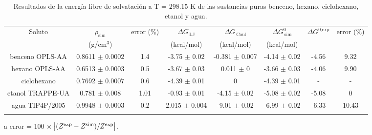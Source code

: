 \documentclass[3p,twocolumn]{elsarticle}
\begin{document}
\begin{table}[htp]
\centering
\begin{adjustbox}{width=1\textwidth}
\begin{threeparttable}
\caption{Resultados de la energía libre de solvatación a T = 298.15 K de las sustancias puras benceno, hexano, ciclohexano, etanol y agua.}
\begin{tabular}{ c c c c c c c c }
\toprule
Soluto & $\rho_{\text{sim}}$ & error (\%)\tnote{a} & $\Delta G_{\,\text{LJ}}$  & $\Delta G_{\,\text{Coul}}$  & $\Delta G^{0}_{\,\text{sim}}$ & $\Delta G^{\text{0,exp}}$   & error (\%)\tnote{a}\\
 & (g/cm$^{3}$) &  & (kcal/mol) &  (kcal/mol) &  (kcal/mol)   &  \\
\hline
benceno OPLS-AA   & 0.8611 $\pm$ 0.0002 & 1.4 & -3.75  $\pm$ 0.02 & -0.381 $\pm$ 0.007 & -4.14 $\pm$ 0.02 & -4.56 & 9.32  \\
hexano OPLS-AA    & 0.6513 $\pm$ 0.0003 & 0.5 & -3.67  $\pm$  0.03 & 0.011 $\pm$ 0 & -3.66 $\pm$ 0.03 & -4.06 & 9.90 \\
ciclohexano & 0.7692 $\pm$ 0.0007 & 0.6 & -4.39 $\pm$ 0.01 & 0 & -4.39 $\pm$ 0.01 & - & -  \\
etanol TRAPPE-UA   & 0.781 $\pm$ 0.008 & 1.01  &-0.93 $\pm$ 0.01 & -4.15 $\pm$ 0.02  & -5.08  $\pm$ 0.02  & -5.08 & 0 \\
agua TIP4P/2005   &  0.9948 $\pm$ 0.0003 & 0.2 & 2.015 $\pm$ 0.004 & -9.01 $\pm$ 0.02 & -6.99 $\pm$ 0.02 & -6.33  &10.43 \\
 \bottomrule
\label{table:mu_solutos} 
\end{tabular}
\begin{tablenotes}
\item[a] error = 100 $\times$ $\abs{(Z^{\text{exp}} - Z^{\text{sim}})/Z^{\text{exp}}}$.
\end{tablenotes}
\end{threeparttable}
\end{adjustbox}
\end{table}
\end{document}
